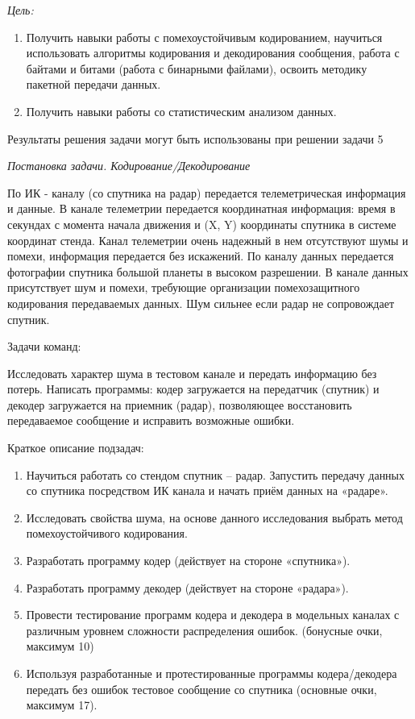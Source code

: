 
\textit{Цель:}

\begin{enumerate}
    \item Получить навыки работы с помехоустойчивым кодированием, научиться использовать алгоритмы кодирования и декодирования сообщения, работа с байтами и битами (работа с бинарными файлами), освоить методику пакетной передачи данных.
    \item Получить навыки работы со статистическим анализом данных.
\end{enumerate}

Результаты решения задачи могут быть использованы при решении задачи 5

\textit{Постановка задачи. Кодирование/Декодирование}

По ИК - каналу (со спутника на радар) передается телеметрическая информация и данные. В канале телеметрии передается координатная информация: время в секундах с момента начала движения и (X, Y) координаты спутника в системе координат стенда. Канал телеметрии очень надежный в нем отсутствуют шумы и помехи, информация передается без искажений. По каналу данных передается фотографии спутника большой планеты в высоком разрешении. В канале данных присутствует шум и помехи, требующие организации помехозащитного кодирования передаваемых данных. Шум сильнее если радар не сопровождает спутник. 

Задачи команд:

Исследовать характер шума в тестовом канале и передать информацию без потерь.
Написать программы: кодер загружается на передатчик (спутник) и декодер загружается на приемник (радар), позволяющее восстановить передаваемое сообщение и исправить возможные ошибки.

Краткое описание подзадач:

\begin{enumerate}
    \item Научиться работать со стендом спутник – радар. Запустить передачу данных со спутника посредством ИК канала и начать приём данных на «радаре».
    \item Исследовать свойства шума, на основе данного исследования выбрать метод помехоустойчивого кодирования.
    \item Разработать программу кодер (действует на стороне «спутника»).
    \item Разработать программу декодер (действует на стороне «радара»).
    \item Провести тестирование программ кодера и декодера в модельных каналах с различным уровнем сложности распределения ошибок. (бонусные очки, максимум 10)
    \item  Используя разработанные и протестированные программы кодера/декодера передать без ошибок тестовое сообщение со спутника (основные очки, максимум 17).
\end{enumerate}

